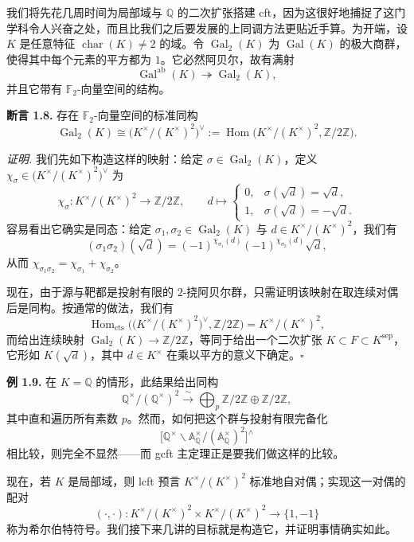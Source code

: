我们将先花几周时间为局部域与 $\mathbb{Q}$ 的二次扩张搭建 cft，因为这很好地捕捉了这门学科令人兴奋之处，而且比我们之后要发展的上同调方法更贴近手算。为开端，设 $K$ 是任意特征 $\operatorname{char}(K)\neq 2$ 的域。令 $\operatorname{Gal}_2(K)$ 为 $\operatorname{Gal}(K)$ 的极大商群，使得其中每个元素的平方都为 $1$。它必然阿贝尔，故有满射
\[
  \operatorname{Gal}^{\mathrm{ab}}(K)\twoheadrightarrow\operatorname{Gal}_2(K),
\]
并且它带有 $\mathbb{F}_2$-向量空间的结构。

\textbf{断言 1.8.} 存在 $\mathbb{F}_2$-向量空间的标准同构
\[
  \operatorname{Gal}_2(K)\cong\big(K^{\times}/(K^{\times})^2\big)^{\vee}
  :=\operatorname{Hom}\big(K^{\times}/(K^{\times})^2,\mathbb{Z}/2\mathbb{Z}\big).
\]

\textit{证明.} 我们先如下构造这样的映射：给定 $\sigma\in\operatorname{Gal}_2(K)$，定义 $\chi_\sigma\in\big(K^{\times}/(K^{\times})^2\big)^{\vee}$ 为
\[
  \chi_\sigma\colon K^{\times}/(K^{\times})^2\to\mathbb{Z}/2\mathbb{Z},\qquad
  d\mapsto
  \begin{cases}
    0, & \sigma(\sqrt{d})=\sqrt{d},\\
    1, & \sigma(\sqrt{d})=-\sqrt{d}.
  \end{cases}
\]
容易看出它确实是同态：给定 $\sigma_1,\sigma_2\in\operatorname{Gal}_2(K)$ 与 $d\in K^{\times}/(K^{\times})^2$，我们有
\[
  (\sigma_1\sigma_2)(\sqrt{d})=(-1)^{\chi_{\sigma_1}(d)}(-1)^{\chi_{\sigma_2}(d)}\sqrt{d},
\]
从而 $\chi_{\sigma_1\sigma_2}=\chi_{\sigma_1}+\chi_{\sigma_2}$。

现在，由于源与靶都是投射有限的 $2$-挠阿贝尔群，只需证明该映射在取连续对偶后是同构。按通常的做法，我们有
\[
  \operatorname{Hom}_{\mathrm{cts}}\Big(\big(K^{\times}/(K^{\times})^2\big)^{\vee},\mathbb{Z}/2\mathbb{Z}\Big)
  =K^{\times}/(K^{\times})^2,
\]
而给出连续映射 $\operatorname{Gal}_2(K)\to\mathbb{Z}/2\mathbb{Z}$，等同于给出一个二次扩张 $K\subset F\subset K^{\mathrm{sep}}$，它形如 $K(\sqrt{d})$，其中 $d\in K^{\times}$ 在乘以平方的意义下确定。\hfill$\square$

\textbf{例 1.9.} 在 $K=\mathbb{Q}$ 的情形，此结果给出同构
\[
  \mathbb{Q}^{\times}/(\mathbb{Q}^{\times})^2
  \xrightarrow{\ \sim\ }\bigoplus_p \mathbb{Z}/2\mathbb{Z}\oplus\mathbb{Z}/2\mathbb{Z},
\]
其中直和遍历所有素数 $p$。然而，如何把这个群与投射有限完备化
\[
  \big[\mathbb{Q}^{\times}\backslash\mathbb{A}_{\mathbb{Q}}^{\times}/(\mathbb{A}_{\mathbb{Q}}^{\times})^2\big]^{\wedge}
\]
相比较，则完全不显然——而 gcft 主定理正是要我们做这样的比较。

现在，若 $K$ 是局部域，则 lcft 预言 $K^{\times}/(K^{\times})^2$ 标准地自对偶；实现这一对偶的配对
\[
  (\cdot,\cdot)\colon K^{\times}/(K^{\times})^2\times K^{\times}/(K^{\times})^2\to\{1,-1\}
\]
称为希尔伯特符号。我们接下来几讲的目标就是构造它，并证明事情确实如此。
